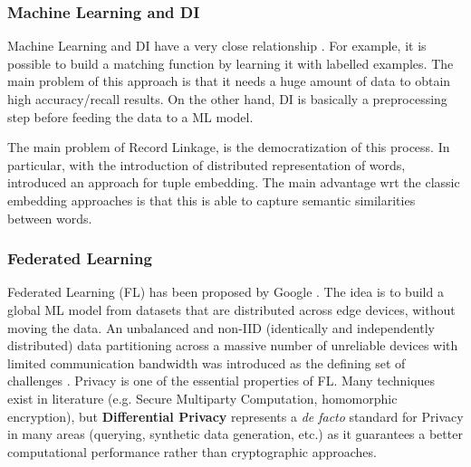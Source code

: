 \documentclass[12pt]{article}
\begin{document}
\subsubsection{Machine Learning and DI}
Machine Learning and DI have a very close relationship \cite*{dong_data_2018}. For example, it is possible to build a matching function by learning it with labelled examples. The main problem of this approach is that it needs a huge amount of data to obtain high accuracy/recall results. On the other hand, DI is basically a preprocessing step before feeding the data to a ML model. 

The main problem of Record Linkage, is the democratization of this process. In particular, with the introduction of distributed representation of words, \cite*{deeper_2018} introduced an approach for tuple embedding. The main advantage wrt the classic embedding approaches is that this is able to capture semantic similarities between words.

\subsubsection{Federated Learning}
Federated Learning (FL) has been proposed by Google \cite*{Kon2016}. The idea is to build a global ML model from datasets that are 
distributed across edge devices, without moving the data. 
An unbalanced and non-IID (identically and independently distributed) data partitioning across a massive number of unreliable 
devices with limited communication bandwidth was introduced as the defining set of challenges \cite*{Kairouz2021}.
Privacy is one of the essential properties of FL. Many techniques exist in literature (e.g. Secure Multiparty Computation, homomorphic encryption), but 
\textbf{Differential Privacy} represents a \textit{de facto} standard for Privacy in many areas (querying, synthetic data generation, etc.) as it guarantees a 
better computational performance rather than cryptographic approaches.
\end{document}
